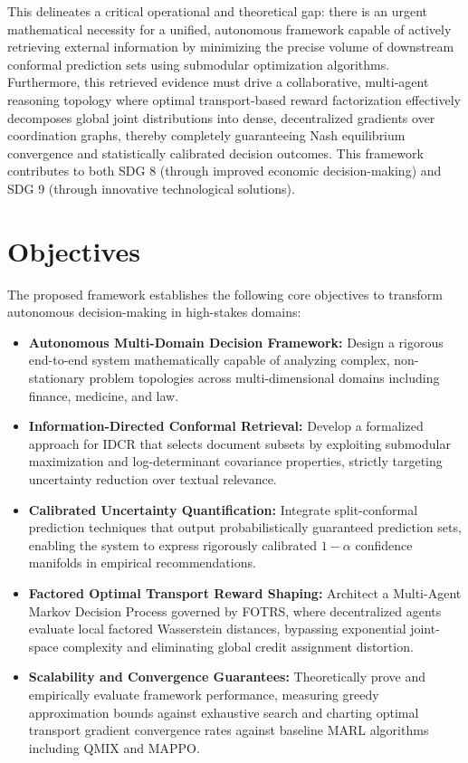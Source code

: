\documentclass[12pt,a4paper,oneside]{report}
\theoremstyle{definition}
\theoremstyle{remark}
\begin{document}
This delineates a critical operational and theoretical gap: there is an urgent mathematical necessity for a unified, autonomous framework capable of actively retrieving external information by minimizing the precise volume of downstream conformal prediction sets using submodular optimization algorithms. Furthermore, this retrieved evidence must drive a collaborative, multi-agent reasoning topology where optimal transport-based reward factorization effectively decomposes global joint distributions into dense, decentralized gradients over coordination graphs, thereby completely guaranteeing Nash equilibrium convergence and statistically calibrated decision outcomes. This framework contributes to both SDG 8 (through improved economic decision-making) and SDG 9 (through innovative technological solutions).

\section{Objectives}

The proposed framework establishes the following core objectives to transform autonomous decision-making in high-stakes domains:

\begin{itemize}
    \item \textbf{Autonomous Multi-Domain Decision Framework:} Design a rigorous end-to-end system mathematically capable of analyzing complex, non-stationary problem topologies across multi-dimensional domains including finance, medicine, and law.

    \item \textbf{Information-Directed Conformal Retrieval:} Develop a formalized approach for IDCR that selects document subsets by exploiting submodular maximization and log-determinant covariance properties, strictly targeting uncertainty reduction over textual relevance.

    \item \textbf{Calibrated Uncertainty Quantification:} Integrate split-conformal prediction techniques that output probabilistically guaranteed prediction sets, enabling the system to express rigorously calibrated $1-\alpha$ confidence manifolds in empirical recommendations.

    \item \textbf{Factored Optimal Transport Reward Shaping:} Architect a Multi-Agent Markov Decision Process governed by FOTRS, where decentralized agents evaluate local factored Wasserstein distances, bypassing exponential joint-space complexity and eliminating global credit assignment distortion.

    \item \textbf{Scalability and Convergence Guarantees:} Theoretically prove and empirically evaluate framework performance, measuring greedy approximation bounds against exhaustive search and charting optimal transport gradient convergence rates against baseline MARL algorithms including QMIX and MAPPO.
\end{itemize}
\end{document}

